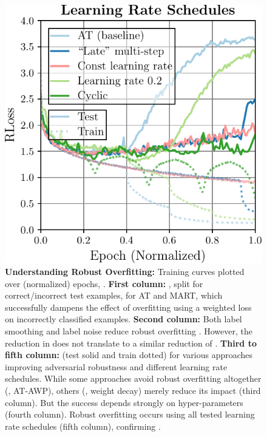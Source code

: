 \begin{figure}[t]
\begin{minipage}[t]{0.2\textwidth}
		\includegraphics[width=\textwidth]{plots_main_understanding_lr}
	\end{minipage}
	\vspace*{-6px}
	\caption{\textbf{Understanding Robust Overfitting:} Training curves plotted over (normalized) epochs, . \textbf{First column:} \RCE, split for correct/incorrect test examples, for AT and MART, which successfully dampens the effect of overfitting using a weighted loss on incorrectly classified examples. \textbf{Second column:} Both label smoothing and label noise reduce robust overfitting \wrt \RCE. However, the reduction in \RCE does not translate to a similar reduction of \RTE. \textbf{Third to fifth column:} \RCE (test solid and train dotted) for various approaches improving adversarial robustness and different learning rate schedules. While some approaches avoid robust overfitting altogether (\eg, AT-AWP), others (\eg, weight decay) merely reduce its impact (third column). But the success depends strongly on hyper-parameters (fourth column). Robust overfitting occurs using all tested learning rate schedules (fifth column), confirming \cite{RiceICML2020}.}
	\label{fig:experiments-understanding}
	\vspace*{-6px}
\end{figure}

